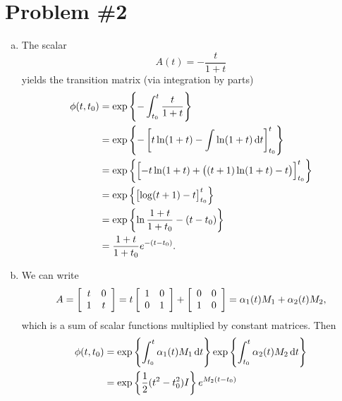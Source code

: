 \documentclass{article}
\begin{document}
\section*{Problem \#2}
\begin{enumerate}[(a)]
  \item{
    The scalar
    $$
    A(t) = -\frac{t}{1 + t}
    $$
    yields the transition matrix (via integration by parts)
    \begin{align*}
      \phi(t, t_0)
      &= \exp\left\{
           -\int_{t_0}^{t} \frac{t}{1 + t}
         \right\} \\
      &= \exp\left\{
           -\left[
              t \ln (1 + t) - \int \ln (1 + t) \dif t
            \right]_{t_0}^{t}
         \right\} \\
      &= \exp\left\{
           \left[
             -t \ln (1 + t) + \left((t + 1) \ln (1 + t) - t\right)
           \right]_{t_0}^{t}
         \right\} \\
      &= \exp\left\{
           \left[
             \log (t + 1) - t
           \right]_{t_0}^{t}
         \right\} \\
      &= \exp\left\{
           \ln\frac{1 + t}{1 + t_0} - (t - t_0)
         \right\} \\
      &= \frac{1 + t}{1 + t_0}e^{-(t - t_0)}.
     \end{align*}
  }
  \item{
    We can write
    $$
    A =
    \left[\begin{array}{c c}
      t & 0 \\
      1 & t
    \end{array}\right]
    =
    t
    \left[\begin{array}{c c}
      1 & 0 \\
      0 & 1
    \end{array}\right]
    +
    \left[\begin{array}{c c}
      0 & 0 \\
      1 & 0
    \end{array}\right]
    =
    \alpha_1(t) M_1 + \alpha_2(t) M_2,
    $$
    which is a sum of scalar functions multiplied by constant
    matrices. Then
    \begin{align*}
    \phi(t, t_0)
    &=
    \exp \left\{
      \int_{t_0}^{t} \alpha_1(t) M_1 \dif t
    \right\}
    \exp \left\{
      \int_{t_0}^{t} \alpha_2(t) M_2 \dif t
    \right\} \\
    &=
    \exp\left\{
      \frac{1}{2}(t^2 - t_0^2) I
    \right\}
    e^{M_2(t - t_0)} \\

\end{align*}}
\end{enumerate}
\end{document}
